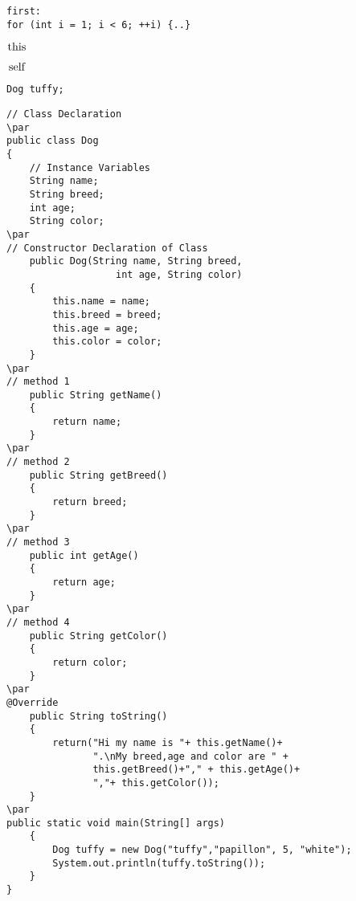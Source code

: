 \documentclass{book}
\def\lthtmlcheckvsize{\ifdim\ht\sizebox<\vsize 
  \ifdim\wd\sizebox<\hsize\expandafter\hfill\fi \expandafter\vfill
  \else\expandafter\vss\fi}%
\begin{document}
{\newpage\clearpage
{}%
\begin{lstlisting}
first:
for (int i = 1; i < 6; ++i) {..}
\end{lstlisting}%
\lthtmlfigureZ
\lthtmlcheckvsize\clearpage}

{\newpage\clearpage
{}%
$\lstinline{this}$%
\lthtmlindisplaymathZ
\lthtmlcheckvsize\clearpage}

{\newpage\clearpage
{}%
$\lstinline{self}$%
\lthtmlindisplaymathZ
\lthtmlcheckvsize\clearpage}

{\newpage\clearpage
{}%
\begin{lstlisting}
Dog tuffy;
\end{lstlisting}%
\lthtmlfigureZ
\lthtmlcheckvsize\clearpage}

{\newpage\clearpage
{}%
\begin{lstlisting}
// Class Declaration
\par
public class Dog
{
    // Instance Variables
    String name;
    String breed;
    int age;
    String color;
\par
// Constructor Declaration of Class
    public Dog(String name, String breed,
                   int age, String color)
    {
        this.name = name;
        this.breed = breed;
        this.age = age;
        this.color = color;
    }
\par
// method 1
    public String getName()
    {
        return name;
    }
\par
// method 2
    public String getBreed()
    {
        return breed;
    }
\par
// method 3
    public int getAge()
    {
        return age;
    }
\par
// method 4
    public String getColor()
    {
        return color;
    }
\par
@Override
    public String toString()
    {
        return("Hi my name is "+ this.getName()+
               ".\nMy breed,age and color are " +
               this.getBreed()+"," + this.getAge()+
               ","+ this.getColor());
    }
\par
public static void main(String[] args)
    {
        Dog tuffy = new Dog("tuffy","papillon", 5, "white");
        System.out.println(tuffy.toString());
    }
}
\end{lstlisting}%
\lthtmlfigureZ
\lthtmlcheckvsize\clearpage}
\end{document}
